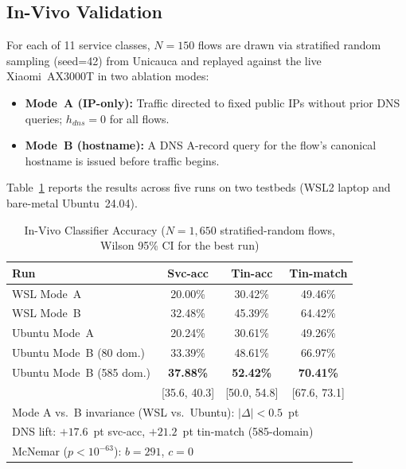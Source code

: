 \subsection{In-Vivo Validation}

For each of 11 service classes, $N=150$ flows are drawn via stratified random sampling (seed=42) from Unicauca and replayed against the live Xiaomi~AX3000T in two ablation modes:
\begin{itemize}
  \item \textbf{Mode~A (IP-only):} Traffic directed to fixed public IPs without prior DNS queries; $h_{dns}=0$ for all flows.
  \item \textbf{Mode~B (hostname):} A DNS A-record query for the flow's canonical hostname is issued before traffic begins.
\end{itemize}

Table~\ref{tab:invivo} reports the results across five runs on two testbeds (WSL2 laptop and bare-metal Ubuntu~24.04).

\begin{table}[h]
\caption{In-Vivo Classifier Accuracy ($N=1{,}650$ stratified-random flows, Wilson 95\% CI for the best run)}
\label{tab:invivo}
\centering
\small
{\setlength{\tabcolsep}{4pt}
\begin{tabular}{l|ccc}
\toprule
\textbf{Run} & \textbf{Svc-acc} & \textbf{Tin-acc} & \textbf{Tin-match} \\
\midrule
WSL    Mode~A             & 20.00\% & 30.42\% & 49.46\% \\
WSL    Mode~B             & 32.48\% & 45.39\% & 64.42\% \\
Ubuntu Mode~A             & 20.24\% & 30.61\% & 49.26\% \\
Ubuntu Mode~B (80 dom.)   & 33.39\% & 48.61\% & 66.97\% \\
Ubuntu Mode~B (585 dom.)  & \textbf{37.88\%} & \textbf{52.42\%} & \textbf{70.41\%} \\
                          & [35.6, 40.3] & [50.0, 54.8] & [67.6, 73.1] \\
\midrule
\multicolumn{4}{l}{\footnotesize Mode A vs.\ B invariance (WSL vs.\ Ubuntu): $|\Delta| < 0.5$~pt} \\
\multicolumn{4}{l}{\footnotesize DNS lift: $+17.6$~pt svc-acc, $+21.2$~pt tin-match (585-domain)} \\
\multicolumn{4}{l}{\footnotesize McNemar ($p < 10^{-63}$): $b{=}291$, $c{=}0$} \\
\bottomrule
\end{tabular}}
\end{table}

